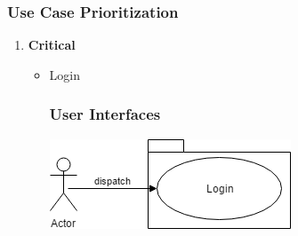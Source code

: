 \documentclass[a4paper,10pt]{article}
\begin{document}
	\subsubsection{Use Case Prioritization} 
		\begin{enumerate} 
		\item \textbf{Critical} 
			\begin{itemize} 
				\item Login
                 \subsubsection{User Interfaces}
		 \includegraphics[scale=0.62]{login.png}


\end{itemize}
\end{enumerate}
\end{document}
